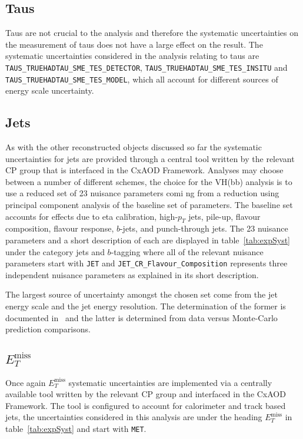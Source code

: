\subsection{Taus}

Taus are not crucial to the analysis and therefore the systematic uncertainties
on the measurement of taus does not have a large effect on the result. The
systematic uncertainties considered in the analysis relating to taus are
\texttt{TAUS\_TRUEHADTAU\_SME\_TES\_DETECTOR},
\texttt{TAUS\_TRUEHADTAU\_SME\_TES\_INSITU} and
\texttt{TAUS\_TRUEHADTAU\_SME\_TES\_MODEL}, which all account for different
sources of energy scale uncertainty.

\subsection{Jets}

As with the other reconstructed objects discussed so far the systematic
uncertainties for jets are provided through a central tool written by the
relevant CP group that is interfaced in the CxAOD Framework. Analyses may choose
between a number of different schemes, the choice for the VH(bb) analysis is to
use a reduced set of 23 nuisance parameters comi
ng from a reduction using
principal component analysis of the baseline set of parameters. The baseline set
accounts for effects due to eta calibration, high-$p_T$ jets, pile-up, flavour
composition, flavour response, $b$-jets, and punch-through jets. The 23 nuisance
parameters and a short description of each are displayed in
table~\ref{tab:expSyst} under the category jets and $b$-tagging where all of the
relevant nuisance parameters start with \texttt{JET} and
\texttt{JET\_CR\_Flavour\_Composition} represents three independent nuisance
parameters as explained in its short description.

The largest source of uncertainty amongst the chosen set come from the jet
energy scale and the jet energy resolution. The determination of the former is
documented in~\cite{JetCalibration2015} and the latter is determined from data
versus Monte-Carlo prediction comparisons.

\subsection{$E_T^{\text{miss}}$}

Once again $E_T^{\text{miss}}$ systematic uncertainties are implemented via a
centrally available tool written by the relevant CP group and interfaced in the
CxAOD Framework. The tool is configured to account for calorimeter and track
based jets, the uncertainties considered in this analysis are under the heading
$E_T^{\text{miss}}$ in table~\ref{tab:expSyst} and start with \texttt{MET}.

